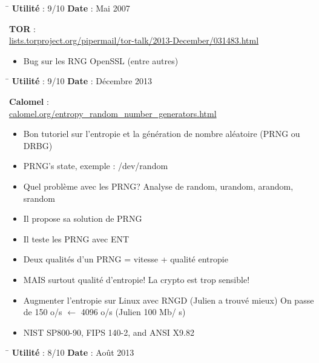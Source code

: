 \documentclass{article}
\begin{document}
	\begin{tabbing}
		\hspace{10cm}\=\kill
		\textbf{Utilité} : 9/10 \>	\textbf{Date} : Mai 2007\\
	\end{tabbing}

	\textbf{TOR} : \\
	\href{https://lists.torproject.org/pipermail/tor-talk/2013-December/031483.html}
	{lists.torproject.org/pipermail/tor-talk/2013-December/031483.html}\\

	\begin{itemize}
		\item Bug sur les RNG OpenSSL (entre autres)
	\end{itemize}

	\begin{tabbing}
		\hspace{10cm}\=\kill
		\textbf{Utilité} : 9/10 \>	\textbf{Date} : Décembre 2013\\
	\end{tabbing}

	\textbf{Calomel} : \\
	\href{https://calomel.org/entropy\_random\_number\_generators.html}
	{calomel.org/entropy\_random\_number\_generators.html}\\

	\begin{itemize}
		\item Bon tutoriel sur l'entropie et la génération de nombre 
		aléatoire (PRNG ou DRBG)
		\item PRNG's state, exemple : /dev/random
		\item Quel problème avec les PRNG? Analyse de random, urandom, 
		arandom, srandom
		\item Il propose sa solution de PRNG
		\item Il teste les PRNG avec ENT
		\item Deux qualités d'un PRNG = vitesse + qualité entropie
		\item MAIS surtout qualité d'entropie! La crypto est trop sensible!
		\item Augmenter l'entropie sur Linux avec RNGD (Julien a trouvé 
		mieux) On passe de 150 o/s $\leftarrow$ 4096 o/s (Julien 100 Mb/
		s)
		\item NIST SP800-90, FIPS 140-2, and ANSI X9.82
	\end{itemize}
	
	\begin{tabbing}
		\hspace{10cm}\=\kill
		\textbf{Utilité} : 8/10 \>	\textbf{Date} : Août 2013\\
	\end{tabbing}
\end{document}
